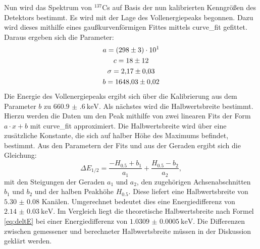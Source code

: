 Nun wird das Spektrum von $^{137}$Cs auf Basis der nun kalibrierten Kenngrößen des Detektors bestimmt. Es wird mit der Lage des Vollenergiepeaks begonnen. Dazu wird dieses mithilfe eines gaußkurvenförmigen Fittes mittels curve\_fit \cite{scipy} gefittet. Daraus ergeben sich die Parameter:
\begin{gather*}
a = \num{298(3)e1}\\
c = \num{18 \pm 12}\\
\sigma = \num{2.17(3)}\\
b = \num{1648.03(2)}
\end{gather*}
 Die Energie des Vollenergiepeaks ergibt sich über die Kalibrierung aus dem Parameter $b$ zu $\SI{660.9(6)}{\kilo\electronvolt}$.
 Als nächstes wird die Halbwertsbreite bestimmt. Hierzu werden die Daten um den Peak mithilfe von zwei linearen Fits der Form $ a \cdot x + b$ mit curve\_fit \cite{scipy} approximiert. Die Halbwertsbreite wird über eine zusätzliche Konstante, die sich auf halber Höhe des Maximums befindet, bestimmt. Aus den Parametern der Fits und aus der Geraden ergibt sich die Gleichung:
\begin{equation}
    \Delta E_\text{1/2} = \frac{-H_{0.5}+b_1}{a_1} + \frac{H_{0.5}-b_2}{a_2}, \label{eq:Z}
\end{equation}
mit den Steigungen der Geraden $a_1$ und $a_2$, den zugehörigen Achsenabschnitten $b_1$ und $b_2$ und der halben Peakhöhe $H_{0.5}$. Diese liefert eine Halbwertsbreite von $\num{5.30(8)}$ Kanälen. Umgerechnet bedeutet dies eine Energiedifferenz von $\SI{2.14(3)}{\kilo\electronvolt}$.
Im Vergleich liegt die theoretische Halbwertsbreite nach Formel \eqref{eq:deltE} bei einer Energiedifferenz von $\SI{1.0309(5)}{\kilo\electronvolt}$. Die Differenzen zwischen gemessener und berechneter Halbwertsbreite müssen in der Diskussion geklärt werden. 
